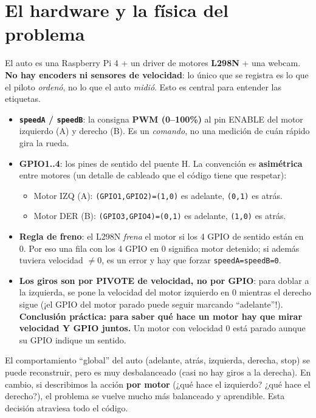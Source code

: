 \documentclass[11pt,a4paper]{article}
\newcommand{\code}[1]{\lstinline[basicstyle=\ttfamily\normalsize]|#1|}
\begin{document}
\section{El hardware y la física del problema}
El auto es una Raspberry Pi 4 + un driver de motores \textbf{L298N} + una webcam. \textbf{No hay encoders ni
sensores de velocidad}: lo único que se registra es lo que el piloto \emph{ordenó}, no lo que el auto
\emph{midió}. Esto es central para entender las etiquetas.

\begin{itemize}
  \item \textbf{\code{speedA} / \code{speedB}}: la consigna \textbf{PWM (0--100\%)} al pin ENABLE del motor
  izquierdo (A) y derecho (B). Es un \emph{comando}, no una medición de cuán rápido gira la rueda.
  \item \textbf{GPIO1..4}: los pines de sentido del puente H. La convención es \textbf{asimétrica} entre
  motores (un detalle de cableado que el código tiene que respetar):
  \begin{itemize}
    \item Motor IZQ (A): \code{(GPIO1,GPIO2)=(1,0)} es adelante, \code{(0,1)} es atrás.
    \item Motor DER (B): \code{(GPIO3,GPIO4)=(0,1)} es adelante, \code{(1,0)} es atrás.
  \end{itemize}
  \item \textbf{Regla de freno}: el L298N \emph{frena} el motor si los 4 GPIO de sentido están en 0. Por eso
  una fila con los 4 GPIO en 0 significa motor detenido; si además tuviera velocidad $\neq 0$, es un error
  y hay que forzar \code{speedA=speedB=0}.
  \item \textbf{Los giros son por PIVOTE de velocidad, no por GPIO}: para doblar a la izquierda, se pone la
  velocidad del motor izquierdo en 0 mientras el derecho sigue (¡el GPIO del motor parado puede seguir
  marcando ``adelante''!). \textbf{Conclusión práctica: para saber qué hace un motor hay que mirar velocidad
  Y GPIO juntos.} Un motor con velocidad 0 está parado aunque su GPIO indique un sentido.
\end{itemize}

\begin{nota}
El comportamiento ``global'' del auto (adelante, atrás, izquierda, derecha, stop) se puede reconstruir, pero
es muy desbalanceado (casi no hay giros a la derecha). En cambio, si describimos la acción \textbf{por motor}
(¿qué hace el izquierdo? ¿qué hace el derecho?), el problema se vuelve mucho más balanceado y aprendible.
Esta decisión atraviesa todo el código.
\end{nota}
\end{document}
